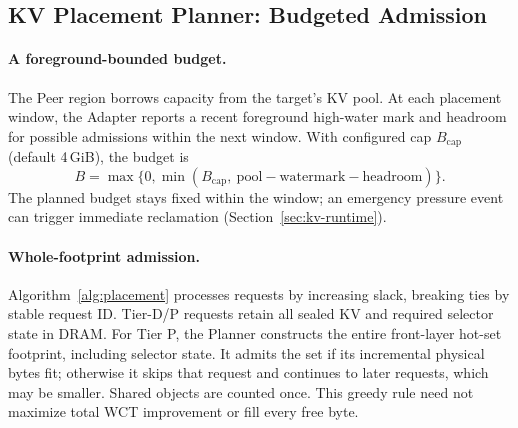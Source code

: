 \subsection{KV Placement Planner: Budgeted Admission}
\label{sec:capacity-allocation}

\paragraph{A foreground-bounded budget.}
The Peer region borrows capacity from the target's KV pool. At each
placement window, the Adapter reports a recent foreground high-water
mark and headroom for possible admissions within the next window.
With configured cap $B_{\mathrm{cap}}$ (default 4\,GiB), the budget is
\begin{equation}
 B=\max\{0,\min(B_{\mathrm{cap}},\ \mathrm{pool}-\mathrm{watermark}
                      -\mathrm{headroom})\}.
 \label{eq:peer-budget}
\end{equation}
The planned budget stays fixed within the window; an emergency pressure
event can trigger immediate reclamation (Section~\ref{sec:kv-runtime}).

\paragraph{Whole-footprint admission.}
Algorithm~\ref{alg:placement} processes requests by increasing slack,
breaking ties by stable request ID. Tier-D/P requests retain all sealed
KV and required selector state in DRAM. For Tier P, the Planner constructs
the entire front-layer hot-set footprint, including selector state.
It admits the set if its incremental physical bytes fit; otherwise it
skips that request and continues to later requests, which may be smaller.
Shared objects are counted once. This greedy rule need not maximize total
WCT improvement or fill every free byte.

